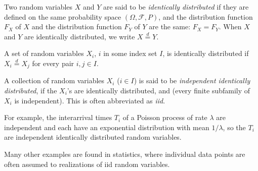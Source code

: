 \documentclass[12pt]{article}
\begin{document}
Two random variables $X$ and $Y$ are said to be \emph{identically distributed} if they are defined on the same probability space $(\Omega,\mathcal{F},P)$, and the distribution function $F_X$ of $X$ and the distribution function $F_Y$ of $Y$ are the same: $F_X=F_Y$.  When $X$ and $Y$ are identically distributed, we write $X \stackrel{d}{=} Y$.  

A set of random variables $X_i$, $i$ in some index set $I$, is identically distributed if $X_i \stackrel{d}{=} X_j$ for every pair $i,j\in I$.

A collection of random variables $X_i$ ($i\in I$) is said to be \emph{independent identically distributed}, if the $X_i$'s are identically distributed, and  (every finite subfamily of $X_i$ is independent). This is often abbreviated as \emph{iid}.

For example, the interarrival times $T_i$ of a Poisson process of rate $\lambda$ are independent and each have an exponential distribution with mean $1/\lambda$, so the $T_i$ are independent identically distributed random variables.

Many other examples are found in statistics, where individual data points are often assumed to realizations of iid random variables.
\end{document}
